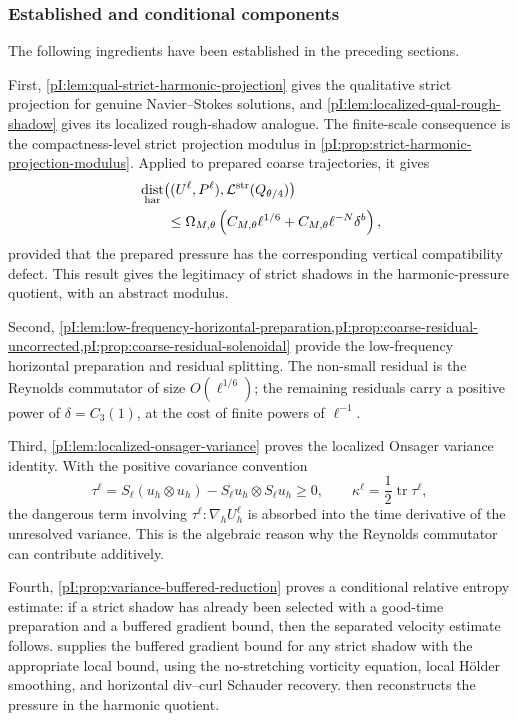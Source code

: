 \documentclass[11pt]{article}
\numberwithin{equation}{section}
\theoremstyle{plain}
\theoremstyle{definition}
\theoremstyle{remark}
\DeclareMathOperator{\dist}{dist}
\newcommand{\nabh}{\nabla_h}
\newcommand{\calL}{\mathcal L}
\begin{document}
\subsubsection{Established and conditional components}

The following ingredients have been established in the preceding sections.

First, \cref{pI:lem:qual-strict-harmonic-projection} gives the qualitative strict projection for genuine Navier--Stokes solutions, and \cref{pI:lem:localized-qual-rough-shadow} gives its localized rough-shadow analogue.  The finite-scale consequence is the compactness-level strict projection modulus in \cref{pI:prop:strict-harmonic-projection-modulus}.  Applied to prepared coarse trajectories, it gives
\[
\begin{aligned}
&\dist_{\rm har}
\bigl((U^\ell,P^\ell),\calL^{\rm str}(Q_{\theta/4})\bigr)\\
&\qquad\le
\Omega_{M,\theta}
\left(
C_{M,\theta}\ell^{1/6}
+
C_{M,\theta}\ell^{-N}\delta^b
\right),
\end{aligned}
\]
provided that the prepared pressure has the corresponding vertical compatibility defect.  This result gives the legitimacy of strict shadows in the harmonic-pressure quotient, with an abstract modulus.

Second, \cref{pI:lem:low-frequency-horizontal-preparation,pI:prop:coarse-residual-uncorrected,pI:prop:coarse-residual-solenoidal} provide the low-frequency horizontal preparation and residual splitting.  The non-small residual is the Reynolds commutator of size \(O(\ell^{1/6})\); the remaining residuals carry a positive power of \(\delta=C_3(1)\), at the cost of finite powers of \(\ell^{-1}\).

Third, \cref{pI:lem:localized-onsager-variance} proves the localized Onsager variance identity.  With the positive covariance convention
\[
        \tau^\ell=S_\ell(u_h\otimes u_h)-S_\ell u_h\otimes S_\ell u_h\ge0,
        \qquad
        \kappa^\ell=\frac12\operatorname{tr}\tau^\ell,
\]
the dangerous term involving \(\tau^\ell:\nabh U_h^\ell\) is absorbed into the time derivative of the unresolved variance.  This is the algebraic reason why the Reynolds commutator can contribute additively.

Fourth, \cref{pI:prop:variance-buffered-reduction} proves a conditional relative entropy estimate: if a strict shadow has already been selected with a good-time preparation and a buffered gradient bound, then the separated velocity estimate follows.   supplies the buffered gradient bound for any strict shadow with the appropriate local bound, using the no-stretching vorticity equation, local H\"older smoothing, and horizontal div--curl Schauder recovery.   then reconstructs the pressure in the harmonic quotient.
\end{document}
